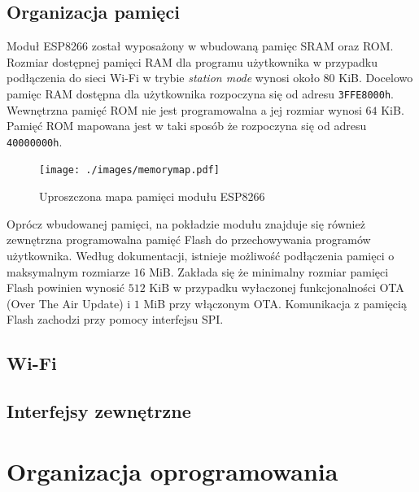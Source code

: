 \subsection{Organizacja pamięci}
\label{pamiec}
Moduł ESP8266 został wyposażony w wbudowaną pamięc SRAM oraz ROM. Rozmiar dostępnej
pamięci RAM dla programu użytkownika w przypadku podłączenia do sieci Wi-Fi w trybie
\textit{station mode} wynosi około $\num{80}$ KiB. Docelowo 
pamięc RAM dostępna dla użytkownika rozpoczyna się od adresu \texttt{3FFE8000h}.
Wewnętrzna pamięć ROM nie jest programowalna a jej rozmiar wynosi $\num{64}$ KiB.
Pamięć ROM mapowana jest w taki sposób że rozpoczyna się od adresu \texttt{40000000h}.

\begin{figure}[H]
    \texttt{[image: ./images/memorymap.pdf]}
    \caption{Uproszczona mapa pamięci modułu ESP8266}
	\label{screen}
\end{figure}

Oprócz wbudowanej pamięci, na pokładzie modułu znajduje się również zewnętrzna programowalna
pamięć Flash do przechowywania programów użytkownika. Według dokumentacji, istnieje
możliwość podłączenia pamięci o maksymalnym rozmiarze $\num{16}$ MiB. Zakłada się 
że minimalny rozmiar pamięci Flash powinien wynosić $\num{512}$ KiB w przypadku wyłaczonej
funkcjonalności OTA (Over The Air Update) i $\num{1}$ MiB przy włączonym OTA. Komunikacja
z pamięcią Flash zachodzi przy pomocy interfejsu SPI.

\subsection{Wi-Fi}
\label{wifi}



\subsection{Interfejsy zewnętrzne}
\label{interfejsy}



\section{Organizacja oprogramowania}
\label{organizacja_opr}